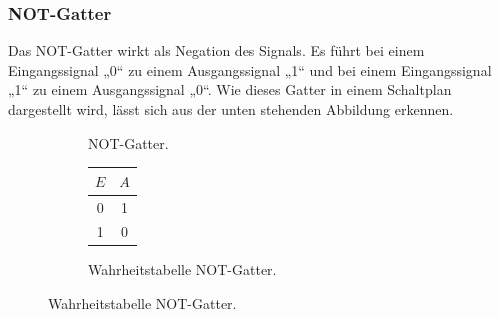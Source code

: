   \subsubsection{NOT-Gatter}
    Das NOT-Gatter wirkt als Negation des Signals.
    Es führt bei einem Eingangssignal „0“ zu einem Ausgangssignal „1“ 
    und bei einem Eingangssignal „1“ zu einem Ausgangssignal „0“.
    Wie dieses Gatter in einem Schaltplan dargestellt wird, lässt sich aus der unten stehenden Abbildung erkennen.
    \begin{figure}[H]
       \begin{subfigure}[t]{0.48\textwidth}%
        \centering
        \caption{NOT-Gatter.\cite{tikz}}
        \vspace{15pt}
      \end{subfigure}
      \hfill
      \begin{subfigure}[t]{0.48\textwidth}
        \centering
        \vspace{0pt}
        \caption{Wahrheitstabelle NOT-Gatter.\cite{digbau}}
        \begin{tabular}{c c}
          \toprule
          $E$ & $A$\\
          \midrule
          0 & 1 \\
          1 & 0 \\
          \bottomrule
        \end{tabular}
      \end{subfigure}
    \end{figure}

